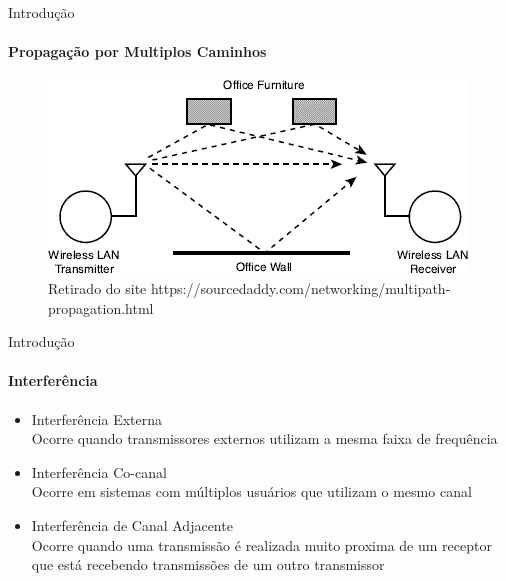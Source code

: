 \documentclass[t]{beamer}
\begin{document}
\begin{darkframes}
  \begin{frame}{Introdução}
    \framesubtitle{Propagação por Multiplos Caminhos}
    \begin{figure}[ht]
      \centering
      \includegraphics[width=\textwidth]{resources/multipath.png}\\
      \footnotesize{Retirado do site https://sourcedaddy.com/networking/multipath-propagation.html}
    \end{figure}
  \end{frame}

  \begin{frame}{Introdução}
    \framesubtitle{Interferência}
    \begin{itemize}
      \item \alert{Interferência Externa}             \\ Ocorre quando transmissores externos utilizam a mesma faixa de frequência
      \item \alert{Interferência Co-canal}            \\ Ocorre em sistemas com múltiplos usuários que utilizam o mesmo canal
      \item \alert{Interferência de Canal Adjacente}  \\ Ocorre quando uma transmissão é realizada muito proxima de um receptor que está recebendo transmissões de um outro transmissor
    \end{itemize}
  \end{frame}


\end{darkframes}
\end{document}
